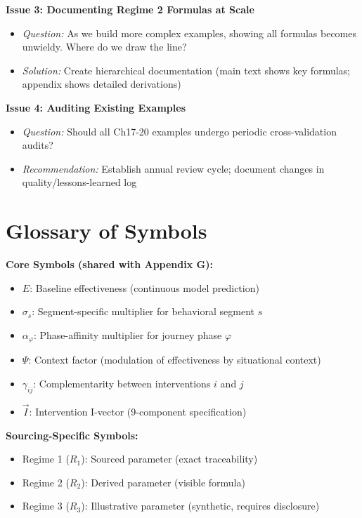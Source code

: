 \begin{table}[htbp]
\textbf{Issue 3: Documenting Regime 2 Formulas at Scale}
\begin{itemize}[nosep]
\item \textit{Question:} As we build more complex examples, showing all formulas becomes unwieldy. Where do we draw the line?
\item \textit{Solution:} Create hierarchical documentation (main text shows key formulas; appendix shows detailed derivations)
\end{itemize}

\textbf{Issue 4: Auditing Existing Examples}
\begin{itemize}[nosep]
\item \textit{Question:} Should all Ch17-20 examples undergo periodic cross-validation audits?
\item \textit{Recommendation:} Establish annual review cycle; document changes in quality/lessons-learned log
\end{itemize}


\section{Glossary of Symbols}
\label{sec:jjj-glossary}

\textbf{Core Symbols (shared with Appendix G):}
\begin{itemize}[nosep]
\item $E$: Baseline effectiveness (continuous model prediction)
\item $\sigma_s$: Segment-specific multiplier for behavioral segment $s$
\item $\alpha_\varphi$: Phase-affinity multiplier for journey phase $\varphi$
\item $\Psi$: Context factor (modulation of effectiveness by situational context)
\item $\gamma_{ij}$: Complementarity between interventions $i$ and $j$
\item $\vec{I}$: Intervention I-vector (9-component specification)
\end{itemize}

\textbf{Sourcing-Specific Symbols:}
\begin{itemize}[nosep]
\item Regime 1 ($R_1$): Sourced parameter (exact traceability)
\item Regime 2 ($R_2$): Derived parameter (visible formula)
\item Regime 3 ($R_3$): Illustrative parameter (synthetic, requires disclosure)
\end{itemize}


\end{table}
